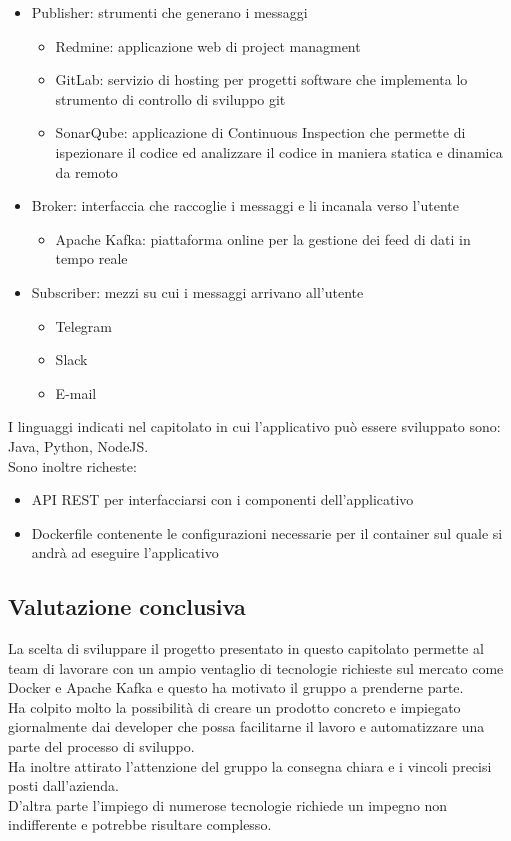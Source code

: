 	\begin{itemize}
		\item Publisher: strumenti che generano i messaggi
		\begin{itemize}
			\item Redmine: applicazione web di project managment
			\item GitLab: servizio di hosting per progetti software che implementa lo strumento di controllo di sviluppo git
			\item SonarQube: applicazione di Continuous Inspection che permette di ispezionare il codice ed analizzare il codice in maniera statica e dinamica da remoto
		\end{itemize}
		\item Broker: interfaccia che raccoglie i messaggi e li incanala verso l'utente
		\begin{itemize}
			\item Apache Kafka: piattaforma online per la gestione dei feed di dati in tempo reale
		\end{itemize}
		\item Subscriber: mezzi su cui i messaggi arrivano all'utente
		\begin{itemize}
			\item Telegram
			\item Slack
			\item E-mail
		\end{itemize}
	\end{itemize}
	I linguaggi indicati nel capitolato in cui l'applicativo può essere sviluppato sono: Java, Python, NodeJS.\\
	Sono inoltre richeste:
	\begin{itemize}
		\item API REST per interfacciarsi con i componenti dell'applicativo
		\item Dockerfile contenente le configurazioni necessarie per il container sul quale si andrà ad eseguire l'applicativo
	\end{itemize}

    \subsection{Valutazione conclusiva}
	La scelta di sviluppare il progetto presentato in questo capitolato permette al team di lavorare con un ampio ventaglio di tecnologie richieste sul mercato come Docker e Apache Kafka e questo ha motivato il gruppo a prenderne parte.\\
	Ha colpito molto la possibilità di creare un prodotto concreto e impiegato giornalmente dai developer che possa facilitarne il lavoro e automatizzare una parte del processo di sviluppo.\\
	Ha inoltre attirato l'attenzione del gruppo la consegna chiara e i vincoli precisi posti dall'azienda.\\
	D'altra parte l'impiego di numerose tecnologie richiede un impegno non indifferente e potrebbe risultare complesso.
	